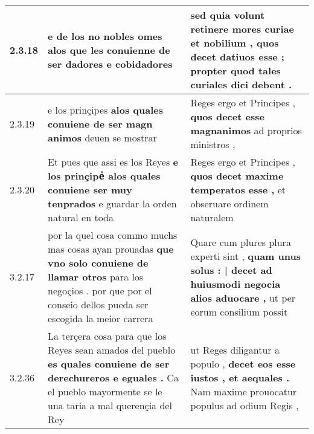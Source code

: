 \begin{tabular}{|p{1cm}|p{6.5cm}|p{6.5cm}|}
2.3.18 & e de los no nobles omes alos \textbf{ que les conuienne de ser dadores } e cobidadores & sed quia volunt retinere mores curiae et nobilium , \textbf{ quos decet datiuos esse ; } propter quod tales curiales dici debent . \\\hline
2.3.19 & e los prinçipes \textbf{ alos quales conuiene de ser magn animos } deuen se mostrar & Reges ergo et Principes , \textbf{ quos decet esse magnanimos } ad proprios ministros , \\\hline
2.3.20 & Et pues que assi es los Reyes \textbf{ e los prinçipeᷤ alos quales conuiene ser muy tenprados } e guardar la orden natural en toda & Reges ergo et Principes , \textbf{ quos decet maxime temperatos esse , } et obseruare ordinem naturalem \\\hline
3.2.17 & por la quel cosa commo muchs mas cosas ayan prouadas \textbf{ que vno solo conuiene de llamar otros } para los negoçios . por que por el conseio dellos pueda ser escogida la meior carrera & Quare cum plures plura experti sint , \textbf{ quam unus solus : | decet ad huiusmodi negocia alios aduocare , } ut per eorum consilium possit \\\hline
3.2.36 & La terçera cosa para que los Reyes sean amados del pueblo \textbf{ es quales conuiene de ser derechureros e eguales . } Ca el pueblo mayormente se le una taria a mal querençia del Rey & ut Reges diligantur a populo , \textbf{ decet eos esse iustos , et aequales . } Nam maxime prouocatur populus ad odium Regis , \\\hline

\end{tabular}
